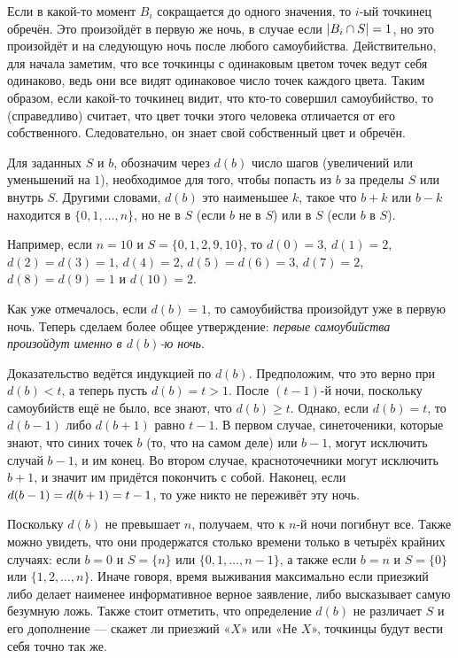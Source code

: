 Если в какой-то момент $B_i$ сокращается до одного значения, то $i$-ый точкинец обречён.
Это произойдёт в первую же ночь, в случае если  $|B_i\z\cap S|=1$, но это произойдёт и на следующую ночь после любого самоубийства.
Действительно, для начала заметим, что все точкинцы с одинаковым цветом точек ведут себя одинаково, ведь они все видят одинаковое число точек каждого цвета.
Таким образом, если какой-то точкинец видит, что кто-то совершил самоубийство, то (справедливо) считает, что цвет точки этого человека отличается от его собственного. 
Следовательно, он знает свой собственный цвет и обречён.

Для заданных $S$ и $b$, обозначим через $d(b)$ число шагов (увеличений или уменьшений на $1$), необходимое для того, чтобы попасть из $b$ за пределы $S$ или внутрь $S$.
Другими словами, $d(b)$ это наименьшее $k$, такое что $b+k$ или $b-k$ находится в $\{0, 1, \dots, n\}$, но не в $S$ (если $b$ не в  $S$) или в $S$ (если $b$ в $S$).

Например, если $n=10$ и 
$S=\{0,1,2,9,10\}$, то 
$d(0)=3$, 
$d(1)=2$, 
$d(2)=d(3)=1$, 
$d(4)=2$, 
$d(5)=d(6)=3$, 
$d(7)=2$, 
$d(8)=d(9)=1$ и
$d(10)=2$.

Как уже отмечалось, если $d(b)=1$, то самоубийства произойдут уже в первую ночь.
Теперь сделаем более общее утверждение: \emph{первые самоубийства произойдут именно в $d(b)$-ю ночь}.

Доказательство ведётся индукцией по $d(b)$.
Предположим, что это верно при $d(b)<t$, а теперь пусть $d(b)=t>1$.
После $(t-1)$-й ночи, поскольку самоубийств ещё не было, все знают, что $d(b)\ge t$.
Однако, если $d(b)=t$, то $d(b-1)$ либо $d(b+1)$ равно $t-1$.
В первом случае, синеточеники, которые знают, что синих точек $b$ (то, что на самом деле) или $b-1$, 
могут исключить случай $b-1$, и им конец.
Во втором случае, красноточечники могут исключить $b+1$, и значит им придётся покончить с собой.
Наконец, если $d(b-1)\z=d(b+1)=t-1$, то уже никто не переживёт эту ночь.

Поскольку $d(b)$ не превышает $n$, получаем, что к $n$-й ночи погибнут все.
Также можно увидеть, что они продержатся столько времени только в четырёх крайних случаях:
если $b=0$ и $S=\{n\}$ или $\{0,1,\dots,n-1\}$,
а также если $b=n$ и $S=\{0\}$ или $\{1,2,\dots,n\}$.
Иначе говоря, время выживания максимально если приезжий либо делает наименее информативное верное заявление,
либо высказывает самую безумную ложь.
Также стоит отметить, что определение $d(b)$ не различает 
$S$ и его дополнение --- скажет ли приезжий «$X$» или «Не $X$», точкинцы будут вести себя точно так же.


